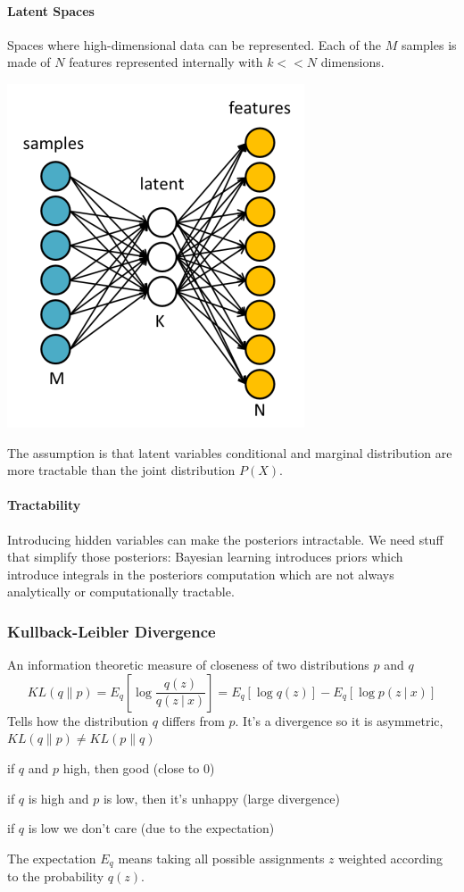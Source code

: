\documentclass[10pt]{report}
\begin{document}
\paragraph{Latent Spaces} Spaces where high-dimensional data can be represented. Each of the $M$ samples is made of $N$ features represented internally with $k<<N$ dimensions.
\begin{center}
	\includegraphics[scale=0.5]{39.png}
\end{center}
The assumption is that latent variables conditional and marginal distribution are more tractable than the joint distribution $P(X)$.
\paragraph{Tractability} Introducing hidden variables can make the posteriors intractable. We need stuff that simplify those posteriors: Bayesian learning introduces priors which introduce integrals in the posteriors computation which are not always analytically or computationally tractable.
\subsubsection{Kullback-Leibler Divergence}
An information theoretic measure of closeness of two distributions $p$ and $q$ $$KL(q\|p) = E_q\left[\log\frac{q(z)}{q(z\:|\:x)}\right] = E_q[\log q(z)] - E_q[\log p(z\:|\:x)]$$
Tells how the distribution $q$ differs from $p$. It's a divergence so it is asymmetric, $KL(q\|p) \neq KL(p\|q)$\begin{list}{}{}
	\item if $q$ and $p$ high, then good (close to $0$)
	\item if $q$ is high and $p$ is low, then it's unhappy (large divergence)
	\item if $q$ is low we don't care (due to the expectation)
\end{list}
The expectation $E_q$ means taking all possible assignments $z$ weighted according to the probability $q(z)$.
\end{document}
